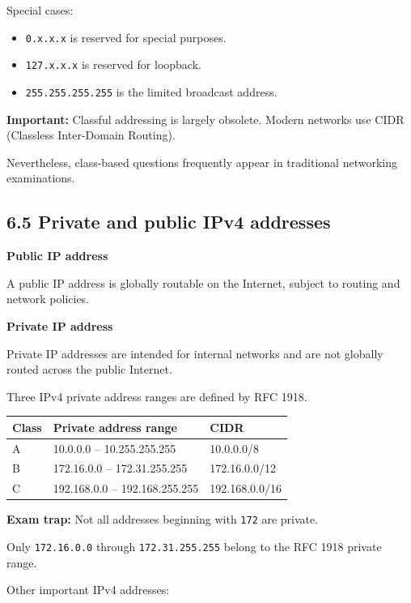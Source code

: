Special cases:

\begin{itemize}
    \item \texttt{0.x.x.x} is reserved for special purposes.
    \item \texttt{127.x.x.x} is reserved for loopback.
    \item \texttt{255.255.255.255} is the limited broadcast address.
\end{itemize}

\textbf{Important:} Classful addressing is largely obsolete. Modern networks use CIDR (Classless Inter-Domain Routing).

Nevertheless, class-based questions frequently appear in traditional networking examinations.

\subsection{6.5 Private and public IPv4 addresses}

\textbf{Public IP address}

A public IP address is globally routable on the Internet, subject to routing and network policies.

\textbf{Private IP address}

Private IP addresses are intended for internal networks and are not globally routed across the public Internet.

Three IPv4 private address ranges are defined by RFC 1918.

\begin{table}[htbp]
\centering
\begin{tabularx}{\textwidth}{p{2.1cm} X X}
\toprule
\textbf{Class} & \textbf{Private address range} & \textbf{CIDR} \\
\midrule
A & 10.0.0.0 -- 10.255.255.255 & 10.0.0.0/8 \\
B & 172.16.0.0 -- 172.31.255.255 & 172.16.0.0/12 \\
C & 192.168.0.0 -- 192.168.255.255 & 192.168.0.0/16 \\
\bottomrule
\end{tabularx}
\end{table}

\textbf{Exam trap:} Not all addresses beginning with \texttt{172} are private.

Only \texttt{172.16.0.0} through \texttt{172.31.255.255} belong to the RFC 1918 private range.

Other important IPv4 addresses:

